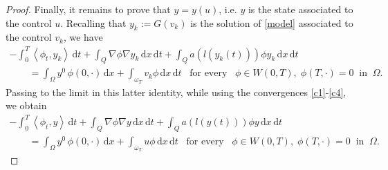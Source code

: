 \documentclass[reqno,twoside]{amsart}
\numberwithin{equation}{section}
\theoremstyle{definition}
\numberwithin{equation}{section}
\def \dis {\displaystyle}
\def \dx{\mathrm{d}x}
\def \dt{\mathrm{d}t}
\def \dq {\mathrm{d}x \, \mathrm{d}t}
\begin{document}
\begin{proof}
Finally, it remains to prove that $y=y(u)$, i.e. $y$ is the state associated to the control $u$. Recalling that $y_k:=G(v_k)$ is the solution of \eqref{model} associated to  the control $v_k$, we have
\begin{equation}\label{weaksoln}
	\begin{array}{lll}
		\dis -\int_{0}^{T} \left\langle \phi_t,y_k\right\rangle \, \dt + \int_Q \nabla \phi\nabla y_k\, \dq+\int_Q a\left(l(y_k(t))\right) \phi y_k\, \dq\\
		\qquad =
		\dis \int_\Omega y^0\,\phi(0,\cdot)\, \dx+\int_{\omega_T}v_k\phi\,\dq \;\;\;\text{for every}\;\;\; \phi \in W(0,T), \; \phi(T,\cdot)=0\;\; \text{in}\;\; \Omega.
	\end{array}
\end{equation}
Passing to the limit in this latter identity, while using the convergences \eqref{c1}-\eqref{c4}, we obtain
\begin{equation}\label{weaksol0}
	\begin{array}{lll}
		\dis -\int_{0}^{T} \left\langle \phi_t,y\right\rangle \, \dt + \int_Q \nabla \phi\nabla y\, \dq+\int_Q a\left(l(y(t))\right) \phi y\, \dq\\
		\qquad =
		\dis \int_\Omega y^0\,\phi(0,\cdot)\, \dx+\int_{\omega_T}u\phi\,\dq \;\;\;\text{for every}\;\;\; \phi \in W(0,T),\; \phi(T,\cdot)=0\;\; \text{in}\;\; \Omega.

\end{array}
\end{equation}
\end{proof}
\end{document}
